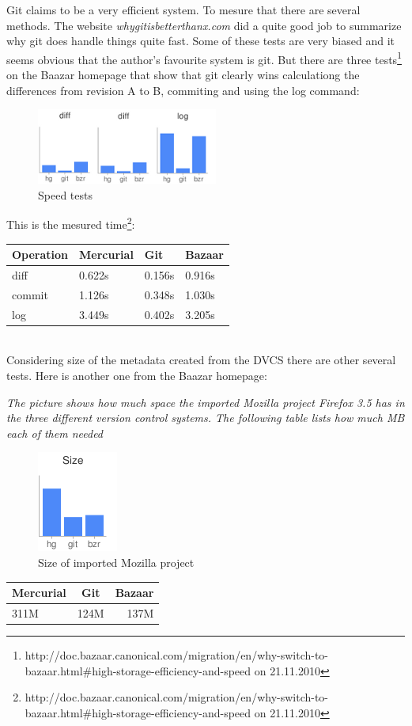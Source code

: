 Git claims to be a very efficient system. To mesure that there are several
methods. The website \emph{whygitisbetterthanx.com} did a quite good job to
summarize why git does handle things quite fast.
Some of these tests are very biased and it seems obvious that the author's favourite system is git. 
But there are three tests\footnote{http://doc.bazaar.canonical.com/migration/en/why-switch-to-bazaar.html\#high-storage-efficiency-and-speed on 21.11.2010} on the Baazar homepage that show that git clearly wins 
calculationg the differences from revision A to B, commiting and using the log command:

\begin{figure}[h]
  \centering
  \includegraphics{img/speed.png}
  \caption{Speed tests}
  \label{fig:Speedtests}  
\end{figure}

This is the mesured time\footnote{http://doc.bazaar.canonical.com/migration/en/why-switch-to-bazaar.html\#high-storage-efficiency-and-speed on 21.11.2010}:\\

\begin{tabular}{ l || l | l | l }
Operation &	Mercurial &	Git & Bazaar \\
\hline
diff & 0.622s & 0.156s & 0.916s\\
commit & 1.126s & 0.348s & 1.030s\\
log & 3.449s & 0.402s & 3.205s\\
\end{tabular}\\

Considering size of the metadata created from the DVCS there are other several tests. Here is another one from the Baazar homepage:

\emph{The picture shows how much space the imported Mozilla project Firefox 3.5 has in the three different version control systems. The following table lists how much MB each of them needed}
\begin{figure}[h]
  \centering
  \includegraphics{img/size.png}
  \caption{Size of imported Mozilla project}
  \label{fig: The imported Mozilla project in Mercurial, Baazar and Git}  
\end{figure}

\begin{center}
\begin{tabular}{ l | c | r }
Mercurial &	Git & Bazaar \\
\hline
311M & 124M & 137M
\end{tabular}
\end{center}


